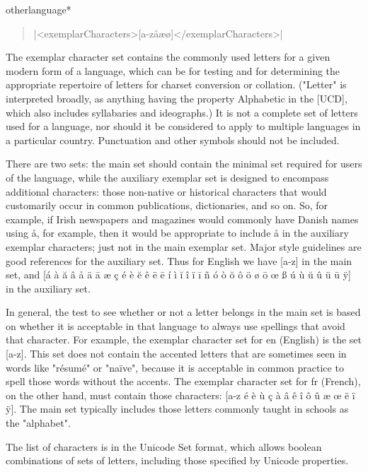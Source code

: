 \begin{docCommandd}{otherlanguage*} { }
\begin{quote}
|<exemplarCharacters>[a-zåæø]</exemplarCharacters>|
\end{quote}

The exemplar character set contains the commonly used letters for a given modern form of a language, which can be for testing and for determining the appropriate repertoire of letters for charset conversion or collation. ("Letter" is interpreted broadly, as anything having the property Alphabetic in the [UCD], which also includes syllabaries and ideographs.) It is not a complete set of letters used for a language, nor should it be considered to apply to multiple languages in a particular country. Punctuation and other symbols should not be included.

There are two sets: the main set should contain the minimal set required for users of the language, while the auxiliary exemplar set is designed to encompass additional characters: those non-native or historical characters that would customarily occur in common publications, dictionaries, and so on. So, for example, if Irish newspapers and magazines would commonly have Danish names using å, for example, then it would be appropriate to include å in the auxiliary exemplar characters; just not in the main exemplar set. Major style guidelines are good references for the auxiliary set. Thus for English we have [a-z] in the main set, and [á à ă â å ä ā æ ç é è ĕ ê ë ē í ì ĭ î ï ī ñ ó ò ŏ ô ö ø ō œ ß ú ù ŭ û ü ū ÿ] in the auxiliary set.

In general, the test to see whether or not a letter belongs in the main set is based on whether it is acceptable in that language to always use spellings that avoid that character. For example, the exemplar character set for en (English) is the set [a-z]. This set does not contain the accented letters that are sometimes seen in words like "résumé" or "naïve", because it is acceptable in common practice to spell those words without the accents. The exemplar character set for fr (French), on the other hand, must contain those characters: [a-z é è ù ç à â ê î ô û æ œ ë ï ÿ]. The main set typically includes those letters commonly taught in schools as the "alphabet".

The list of characters is in the Unicode Set format, which allows boolean combinations of sets of letters, including those specified by Unicode properties.


\end{docCommandd}
